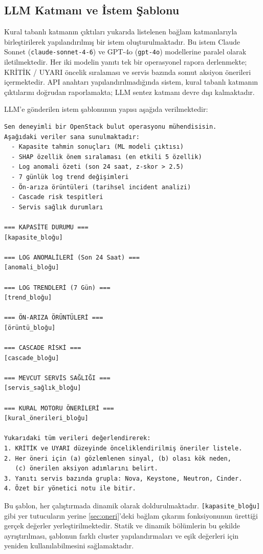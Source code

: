 \subsection{LLM Katmanı ve İstem Şablonu}

Kural tabanlı katmanın çıktıları yukarıda listelenen bağlam katmanlarıyla birleştirilerek yapılandırılmış bir istem oluşturulmaktadır.
Bu istem Claude Sonnet (\texttt{claude-sonnet-4-6}) ve GPT-4o (\texttt{gpt-4o}) modellerine paralel olarak iletilmektedir.
Her iki modelin yanıtı tek bir operasyonel rapora derlenmekte; KRİTİK / UYARI öncelik sıralaması ve servis bazında somut aksiyon önerileri içermektedir.
API anahtarı yapılandırılmadığında sistem, kural tabanlı katmanın çıktılarını doğrudan raporlamakta; LLM sentez katmanı devre dışı kalmaktadır.

LLM'e gönderilen istem şablonunun yapısı aşağıda verilmektedir:

\begin{verbatim}
Sen deneyimli bir OpenStack bulut operasyonu mühendisisin.
Aşağıdaki veriler sana sunulmaktadır:
  - Kapasite tahmin sonuçları (ML modeli çıktısı)
  - SHAP özellik önem sıralaması (en etkili 5 özellik)
  - Log anomali özeti (son 24 saat, z-skor > 2.5)
  - 7 günlük log trend değişimleri
  - Ön-arıza örüntüleri (tarihsel incident analizi)
  - Cascade risk tespitleri
  - Servis sağlık durumları

=== KAPASİTE DURUMU ===
[kapasite_bloğu]

=== LOG ANOMALİLERİ (Son 24 Saat) ===
[anomali_bloğu]

=== LOG TRENDLERİ (7 Gün) ===
[trend_bloğu]

=== ÖN-ARIZA ÖRÜNTÜLERİ ===
[örüntü_bloğu]

=== CASCADE RİSKİ ===
[cascade_bloğu]

=== MEVCUT SERVİS SAĞLIĞI ===
[servis_sağlık_bloğu]

=== KURAL MOTORU ÖNERİLERİ ===
[kural_önerileri_bloğu]

Yukarıdaki tüm verileri değerlendirerek:
1. KRİTİK ve UYARI düzeyinde önceliklendirilmiş öneriler listele.
2. Her öneri için (a) gözlemlenen sinyal, (b) olası kök neden,
   (c) önerilen aksiyon adımlarını belirt.
3. Yanıtı servis bazında grupla: Nova, Keystone, Neutron, Cinder.
4. Özet bir yönetici notu ile bitir.
\end{verbatim}

Bu şablon, her çalıştırmada dinamik olarak doldurulmaktadır.
\texttt{[kapasite\_bloğu]} gibi yer tutucuların yerine \autoref{sec:oneri}'deki bağlam çıkarım fonksiyonunun ürettiği gerçek değerler yerleştirilmektedir.
Statik ve dinamik bölümlerin bu şekilde ayrıştırılması, şablonun farklı cluster yapılandırmaları ve eşik değerleri için yeniden kullanılabilmesini sağlamaktadır.

